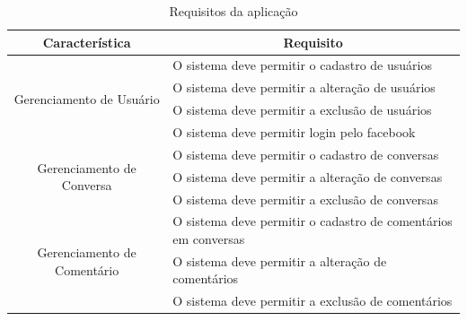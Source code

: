 \begin{table}[h!]
\centering
\caption{Requisitos da aplicação}
\label{tab:requisitos}
\begin{tabular}{@{}cl@{}}
\toprule
\textbf{Característica}                      & \multicolumn{1}{c}{\textbf{Requisito}}                                                                                                \\ \midrule
\multirow{4}{*}{Gerenciamento de Usuário}    & O sistema deve permitir o cadastro de usuários                                                                                        \\
                                             & O sistema deve permitir a alteração de usuários                                                                                       \\
                                             & O sistema deve permitir a exclusão de usuários                                                                                         \\
                                             & O sistema deve permitir login pelo facebook                                                                                           \\\midrule
\multirow{3}{*}{Gerenciamento de Conversa}   & O sistema deve permitir o cadastro de conversas                                                                                       \\
                                             & O sistema deve permitir a alteração de conversas                                                                                      \\
                                             & O sistema deve permitir a exclusão de conversas                                                                                       \\ \midrule
\multirow{4}{*}{Gerenciamento de Comentário} & O sistema deve permitir o cadastro de comentários em conversas                                                                        \\
                                             & O sistema deve permitir a alteração de comentários                                                                                    \\
                                             & O sistema deve permitir a exclusão de comentários                                                                                     \\ 

\end{tabular}
\end{table}
